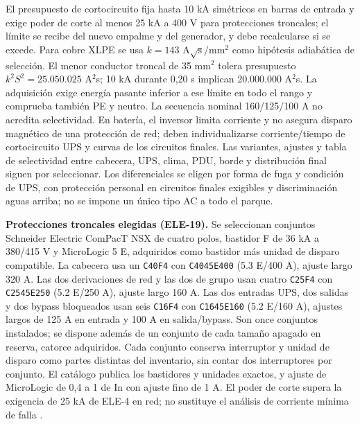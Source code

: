 El presupuesto de cortocircuito fija hasta 10 kA simétricos en barras de entrada y exige poder de corte al menos 25 kA a 400 V para protecciones troncales; el límite se recibe del nuevo empalme y del generador, y debe recalcularse si se excede. Para cobre XLPE se usa $k=143$ A$\sqrt{\mathrm{s}}$/mm$^2$ como hipótesis adiabática de selección. El menor conductor troncal de 35 mm$^2$ tolera presupuesto $k^2S^2=25.050.025$ A$^2$s; 10 kA durante 0,20 s implican 20.000.000 A$^2$s. La adquisición exige energía pasante inferior a ese límite en todo el rango y comprueba también PE y neutro. La secuencia nominal 160/125/100 A no acredita selectividad. En batería, el inversor limita corriente y no asegura disparo magnético de una protección de red; deben individualizarse corriente/tiempo de cortocircuito UPS y curvas de los circuitos finales. Las variantes, ajustes y tabla de selectividad entre cabecera, UPS, clima, PDU, borde y distribución final siguen por seleccionar. Los diferenciales se eligen por forma de fuga y condición de UPS, con protección personal en circuitos finales exigibles y discriminación aguas arriba; no se impone un único tipo AC a todo el parque.

\textbf{Protecciones troncales elegidas (ELE-19).} Se seleccionan conjuntos Schneider Electric ComPacT NSX de cuatro polos, bastidor F de 36 kA a 380/415 V y MicroLogic 5 E, adquiridos como bastidor más unidad de disparo compatible. La cabecera usa un \texttt{C40F4} con \texttt{C4045E400} (5.3 E/400 A), ajuste largo 320 A. Las dos derivaciones de red y las dos de grupo usan cuatro \texttt{C25F4} con \texttt{C2545E250} (5.2 E/250 A), ajuste largo 160 A. Las dos entradas UPS, dos salidas y dos bypass bloqueados usan seis \texttt{C16F4} con \texttt{C1645E160} (5.2 E/160 A), ajustes largos de 125 A en entrada y 100 A en salida/bypass. Son once conjuntos instalados; se dispone además de un conjunto de cada tamaño apagado en reserva, catorce adquiridos. Cada conjunto conserva interruptor y unidad de disparo como partes distintas del inventario, sin contar dos interruptores por conjunto. El catálogo publica los bastidores y unidades exactos, y ajuste de MicroLogic de 0,4 a 1 de In con ajuste fino de 1 A. El poder de corte supera la exigencia de 25 kA de ELE-4 en red; no sustituye el análisis de corriente mínima de falla \parencite[pp.~43, 49, 289 y 316]{lote19-schneider-compact}.

